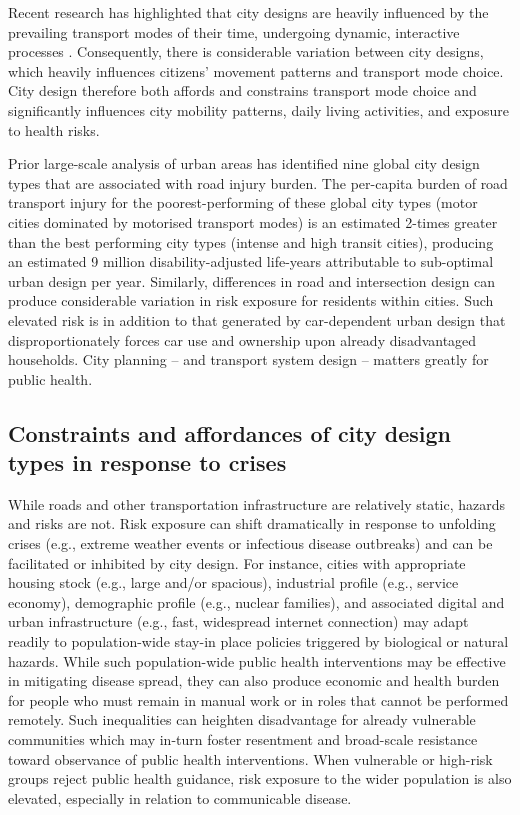 \documentclass[preprint,10pt]{elsarticle} %
\begin{document}
Recent research has highlighted that city designs are heavily influenced by the prevailing transport modes of their time\cite{KNOWLES2020102607}, undergoing dynamic, interactive processes \cite{Strano2012}. Consequently, there is considerable variation between city designs, which heavily influences citizens' movement patterns and transport mode choice\cite{Thompson2020}. City design therefore both affords and constrains transport mode choice and significantly influences city mobility patterns, daily living activities, and exposure to health risks\cite{WHO2023}.

Prior large-scale analysis of urban areas has identified nine global city design types that are associated with road injury burden\cite{Thompson2020}. The per-capita burden of road transport injury for the poorest-performing of these global city types (motor cities dominated by motorised transport modes) is an estimated 2-times greater than the best performing city types (intense and high transit cities), producing an estimated 9 million disability-adjusted life-years attributable to sub-optimal urban design per year\cite{Thompson2020}. Similarly, differences in road and intersection design can produce considerable variation in risk exposure for residents within cities\cite{Wijnands_IntersectionDesign2021,MORRISON2019123}. Such elevated risk is in addition to that generated by car-dependent urban design that disproportionately forces car use and ownership upon already disadvantaged households\cite{currie2018alarming, CURL201861}. City planning -- and transport system design -- matters greatly for public health.



\subsection*{Constraints and affordances of city design types in response to crises}
While roads and other transportation infrastructure are relatively static, hazards and risks are not. Risk exposure can shift dramatically in response to unfolding crises (e.g., extreme weather events or infectious disease outbreaks) and can be facilitated or inhibited by city design. For instance, cities with appropriate housing stock (e.g., large and/or spacious), industrial profile (e.g., service economy), demographic profile (e.g., nuclear families), and associated digital and urban infrastructure (e.g., fast, widespread internet connection) may adapt readily to population-wide stay-in place policies triggered by biological or natural hazards\cite{hale2021global}. While such population-wide public health interventions may be effective in mitigating disease spread, they can also produce economic and health burden for people who must remain in manual work or in roles that cannot be performed remotely\cite{CraigWFH,Vyas2021}. Such inequalities can heighten disadvantage for already vulnerable communities\cite{martin2020fighting} which may in-turn foster resentment and broad-scale resistance toward observance of public health interventions\cite{de2016sustainability}. When vulnerable or high-risk groups reject public health guidance, risk exposure to the wider population is also elevated, especially in relation to communicable disease\cite{koopman2005control}.
\end{document}
